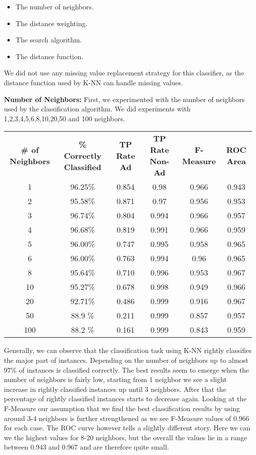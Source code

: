 \documentclass{article}
\begin{document}
\begin{itemize}
\item The number of neighbors.
\item The distance weighting.
\item The search algorithm.
\item The distance function.
\end{itemize}

We did not use any missing value replacement strategy for this classifier, as the distance function used by K-NN can handle missing values. 

\textbf{Number of Neighbors:}
First, we experimented with the number of neighbors used by the classification algorithm. We did experiments with 1,2,3,4,5,6,8,10,20,50 and 100 neighbors.


\begin{tabular}{ c | c | c | c | c | c}
\textbf{\# of Neighbors} & \textbf{\% Correctly Classified} & \textbf{TP Rate Ad} & \textbf{TP Rate Non-Ad} & \textbf{F-Measure} & \textbf{ROC Area}\\
1   & 96.25\% & 0.854 & 0.98  & 0.966 & 0.943\\
2   & 95.58\% & 0.871 & 0.97  & 0.956 & 0.953\\
3   & 96.74\% & 0.804 & 0.994 & 0.966 & 0.957\\
4   & 96.68\% & 0.819 & 0.991 & 0.966 & 0.959\\
5   & 96.00\% & 0.747 & 0.995 & 0.958 & 0.965\\
6   & 96.00\% & 0.763 & 0.994 & 0.96  & 0.965\\
8   & 95.64\% & 0.710 & 0.996 & 0.953 & 0.967\\
10  & 95.27\% & 0.678 & 0.998 & 0.949 & 0.966\\
20  & 92.71\% & 0.486 & 0.999 & 0.916 & 0.967\\
50  & 88.9 \% & 0.211 & 0.999 & 0.857 & 0.957\\
100 & 88.2 \% & 0.161 & 0.999 & 0.843 & 0.959\\
\end{tabular}


Generally, we can observe that the classification task using K-NN rightly classifies the major part of instances. Depending on the number of neighbors up to almost 97\% of instances is classified correctly. The best results seem to emerge when the number of neighbors is fairly low, starting from 1 neighbor we see a slight increase in rightly classified instances up until 3 neighbors. After that the percentage of rightly classified instances starts to decrease again. Looking at the F-Measure our assumption that we find the best classification results by using around 3-4 neighbors is further strengthened as we see F-Measure values of 0.966 for each case. The ROC curve however tells a slightly different story. Here we can we the highest values for 8-20 neighbors, but the overall the values lie in a range between 0.943 and 0.967 and are therefore quite small.
\end{document}
